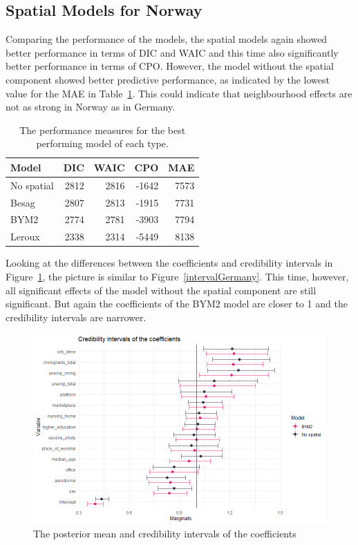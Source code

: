 \subsection{Spatial Models for Norway}
Comparing the performance of the models, the spatial models again showed better performance in terms of DIC and WAIC and this time also significantly better performance in terms of CPO. However, the model without the spatial component showed better predictive performance, as indicated by the lowest value for the MAE in Table~\ref{allNorway}. This could indicate that neighbourhood effects are not as strong in Norway as in Germany.
\begin{table}[H] 
\caption{The performance measures for the best performing model of each type. \label{allNorway}}
\begin{tabular}{l r r r r}
\toprule
\textbf{Model}	& \textbf{DIC}	& \textbf{WAIC} & \textbf{CPO} & \textbf{MAE} \\
\midrule
No spatial & 2812 & 2816 & -1642 & 7573 \\
Besag & 2807 & 2813 & -1915 & 7731 \\
BYM2 & 2774 & 2781 & -3903 & 7794\\
Leroux & 2338 & 2314 & -5449 & 8138\\
\bottomrule
\end{tabular}
\end{table}
Looking at the differences between the coefficients and credibility intervals in Figure~\ref{intervalNorway}, the picture is similar to Figure~\ref{intervalGermany}. This time, however, all significant effects of the model without the spatial component are still significant. But again the coefficients of the BYM2 model are closer to 1 and the credibility intervals are narrower.
\begin{figure}[H]
  \centering
  \includegraphics[width = \textwidth]{intervals_norway.png}
  \caption{The posterior mean and credibility intervals of the coefficients}
  \label{intervalNorway}
\end{figure}

